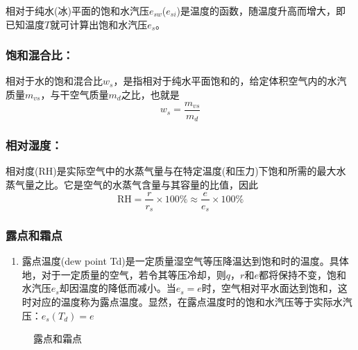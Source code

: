 \documentclass[UTF8,a4paper,11pt,oneside]{ctexbook}
\begin{document}
相对于纯水(冰)平面的饱和水汽压\(e_{sw}\)(\(e_{si}\))是温度的函数，随温度升高而增大，即已知温度\(T\)就可计算出饱和水汽压\(e_s\)。

\subsubsection{饱和混合比：}

相对于水的饱和混合比\(w_s\)，是指相对于纯水平面饱和的，给定体积空气内的水汽质量\(m_{vs}\)，与干空气质量\(m_d\)之比，也就是
\begin{equation}
w_s=\dfrac{m_{vs}}{m_d}
\end{equation}

\subsubsection{相对湿度：}

相对度(RH)是实际空气中的水蒸气量与在特定温度(和压力)下饱和所需的最大水蒸气量之比。它是空气的水蒸气含量与其容量的比值，因此
\begin{equation}
\mathrm{RH}=\dfrac{r}{r_s}\times100\%\approx\dfrac{e}{e_s}\times100\%
\end{equation}

\subsubsection{露点和霜点}
\begin{enumerate}
    \item 露点温度(dew point Td)是一定质量湿空气等压降温达到饱和时的温度。具体地，对于一定质量的空气，若令其等压冷却，则\(q\)，\(r\)和\(e\)都将保持不变，饱和水汽压\(e_s\)却因温度的降低而减小。当\(e_s=e\)时，空气相对平水面达到饱和，这时对应的温度称为露点温度。显然，在露点温度时的饱和水汽压等于实际水汽压：\(e_s(T_d)=e\)
\end{enumerate}
\begin{figure}[htbp]
    \centering
{}
    \caption{露点和霜点}
\end{figure}
\end{document}
